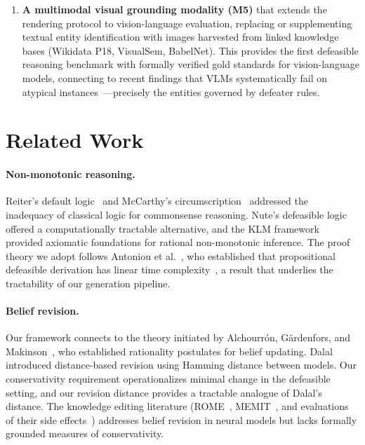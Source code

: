 \documentclass{article}
\theoremstyle{definition}
\begin{document}
\begin{enumerate}[label=(\arabic*),nosep]
    \item \textbf{A multimodal visual grounding modality (M5)} that extends the rendering protocol to vision-language evaluation, replacing or supplementing textual entity identification with images harvested from linked knowledge bases (Wikidata P18, VisualSem, BabelNet). This provides the first defeasible reasoning benchmark with formally verified gold standards for vision-language models, connecting to recent findings that VLMs systematically fail on atypical instances~\cite{park2025visage}---precisely the entities governed by defeater rules.
\end{enumerate}


\section{Related Work}\label{sec:related}

\paragraph{Non-monotonic reasoning.}
Reiter's default logic~\cite{reiter1980logic} and McCarthy's circumscription~\cite{mccarthy1980circumscription} addressed the inadequacy of classical logic for commonsense reasoning. Nute's defeasible logic~\cite{nute1987defeasible, nute1994defeasible} offered a computationally tractable alternative, and the KLM framework~\cite{kraus1990nonmonotonic} provided axiomatic foundations for rational non-monotonic inference. The proof theory we adopt follows Antoniou et al.~\cite{antoniou2001defeasible}, who established that propositional defeasible derivation has linear time complexity~\cite{maher2001propositional}, a result that underlies the tractability of our generation pipeline.

\paragraph{Belief revision.}
Our framework connects to the theory initiated by Alchourr\'{o}n, G\"{a}rdenfors, and Makinson~\cite{alchourron1985logic}, who established rationality postulates for belief updating. Dalal~\cite{dalal1988investigations} introduced distance-based revision using Hamming distance between models. Our conservativity requirement operationalizes minimal change in the defeasible setting, and our revision distance provides a tractable analogue of Dalal's distance. The knowledge editing literature (ROME~\cite{meng2022locating}, MEMIT~\cite{meng2023mass}, and evaluations of their side effects~\cite{cohen2024evaluating}) addresses belief revision in neural models but lacks formally grounded measures of conservativity.
\end{document}
